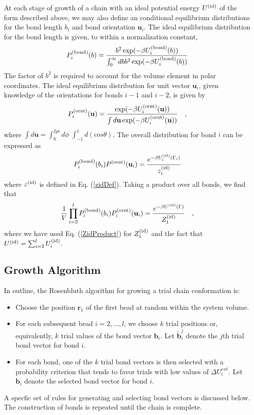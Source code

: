 \documentclass[12pt]{article}
\newcommand{\vv}[1]{\mathbf{#1}}
\newcommand\chain{\Gamma}
\newcommand\delU{\Delta U}
\newcommand\Uid{U^{({\rm id})}}
\newcommand\Zid{Z^{({\rm id})}}
\newcommand\qbead{\vv{r}_{1}}
\newcommand\nbead{l}
\newcommand\vbond{\vv{b}}
\newcommand\ubond{\vv{u}}
\newcommand\rbond{b}
\newcommand\ntrial{k}
\newcommand\vtrial{\tilde{\vv{b}}}
\newcommand\Ubond{U^{({\rm bond})}}
\newcommand\Uornt{U^{({\rm ornt})}}
\newcommand\Pbond{P^{({\rm bond})}}
\newcommand\Pornt{P^{({\rm ornt})}}
\newcommand\zid{z^{({\rm id})}}
\begin{document}
At each stage of growth of a chain with an ideal potential energy $\Uid$ of the form described above, we may also define an conditional equilibrium distributions for the bond length $\rbond_{i}$ and bond orientation $\ubond_{i}$. The ideal equilibrium distribution for the bond length is given, to within a normalization constant,
\begin{equation}
    \Pbond_{i}(\rbond) = 
    \frac{\rbond^{2} \exp( -\beta \Ubond_{i}(\rbond) )}
         {\int_{0}^{\infty}d\rbond \rbond^{2} \exp( -\beta \Ubond_{i}(\rbond) )}
\end{equation}
The factor of $\rbond^{2}$ is required to account for the volume element in polar coordinates.  The ideal equilibrium distribution for unit vector $\ubond_{i}$, given knowledge of the orientations for bonds $i-1$ and $i-2$, is given by
\begin{equation}
    \Pornt_{i}(\ubond) =
    \frac{\exp( -\beta \Uornt_{i}(\ubond))}
         {\int d\ubond \exp( -\beta \Uornt_{i}(\ubond))}
    \quad,
\end{equation}
where $\int d\ubond = \int_{0}^{2pi}d\phi \; \int_{-1}^{1}d(cos\theta)$.
The overall distribution for bond $i$ can be expressed as
\begin{equation}
   \Pbond_{i}(\rbond_{i})\Pornt(\ubond_{i}) = 
   \frac{e^{-\beta\Uid_{i}(\chain_i) }} {\zid_{i}}
   \label{PtrialNormalized}
\end{equation}
where $\zid$ is defined in Eq. (\ref{zidDef}). Taking a product over all
bonds, we find that
\begin{equation}
   \frac{1}{V}\prod_{i=2}^{\nbead}
   \Pbond_{i}(\rbond_{i})\Pornt_{i}(\ubond_{i}) = \frac{e^{-\beta\Uid(\chain) }} {\Zid_{1}}
   \quad, \label{PtrialProduct}
\end{equation}
where we have used Eq. (\ref{ZidProduct}) for $\Zid_{1}$ and the fact that
$\Uid = \sum_{i=2}^{\nbead}\Uid_{i}$.

\subsection{Growth Algorithm}
In outline, the Rosenbluth algorithm for growing a trial chain conformation is:
\begin{itemize}
\item Choose the position $\qbead$ of the first bead at random within the system 
      volume.
\item For each subsequent bead $i=2,\ldots, \nbead$, we choose $\ntrial$ trial 
positions or, equivalently, $\ntrial$ trial values of the bond vector $\vbond_{i}$. 
Let $\vtrial_{i}^{j}$ denote the $j$th trial bond vector for bond $i$.
\item For each bond, one of the $\ntrial$ trial bond vectors is then selected with a 
probability criterion that tends to favor trials with low values of $\delU^{ext}_{i}$.
Let $\vbond_{i}$ denote the selected bond vector for bond $i$.  
\end{itemize} 
A specfic set of rules for generating and selecting bond vectors is discussed below.  The construction of bonds is repeated until the chain is complete.
\end{document}
